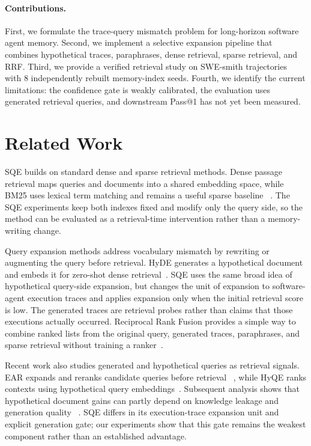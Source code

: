 \documentclass[10pt,twocolumn]{article}
\begin{document}
\paragraph{Contributions.}
First, we formulate the trace-query mismatch problem for long-horizon software
agent memory. Second, we implement a selective expansion pipeline that combines
hypothetical traces, paraphrases, dense retrieval, sparse retrieval, and RRF.
Third, we provide a verified retrieval study on SWE-smith trajectories~\cite{yang2025swesmith} with
8 independently rebuilt memory-index seeds. Fourth, we identify the current
limitations: the confidence gate is weakly calibrated, the evaluation uses
generated retrieval queries, and downstream Pass@1 has not yet been measured.

\section{Related Work}
SQE builds on standard dense and sparse retrieval methods. Dense passage
retrieval maps queries and documents into a shared embedding space, while BM25
uses lexical term matching and remains a useful sparse baseline
~\cite{karpukhin2020dpr,robertson2009bm25}. The SQE experiments keep both
indexes fixed and modify only the query side, so the method can be evaluated as
a retrieval-time intervention rather than a memory-writing change.

Query expansion methods address vocabulary mismatch by rewriting or augmenting
the query before retrieval. HyDE generates a hypothetical document and embeds it
for zero-shot dense retrieval~\cite{gao2023hyde}. SQE uses the same broad idea
of hypothetical query-side expansion, but changes the unit of expansion to
software-agent execution traces and applies expansion only when the initial
retrieval score is low. The generated traces are retrieval probes rather than
claims that those executions actually occurred. Reciprocal Rank Fusion provides
a simple way to combine ranked lists from
the original query, generated traces, paraphrases, and sparse retrieval without
training a ranker~\cite{cormack2009rrf}.

Recent work also studies generated and hypothetical queries as retrieval
signals. EAR expands and reranks candidate queries before retrieval
~\cite{chuang2023ear}, while HyQE ranks contexts using hypothetical query
embeddings~\cite{zhou2024hyqe}. Subsequent analysis shows that hypothetical
document gains can partly depend on knowledge leakage and generation quality
~\cite{yoon2025hypothetical}. SQE differs in its execution-trace expansion unit
and explicit generation gate; our experiments show that this gate remains the
weakest component rather than an established advantage.
\end{document}
